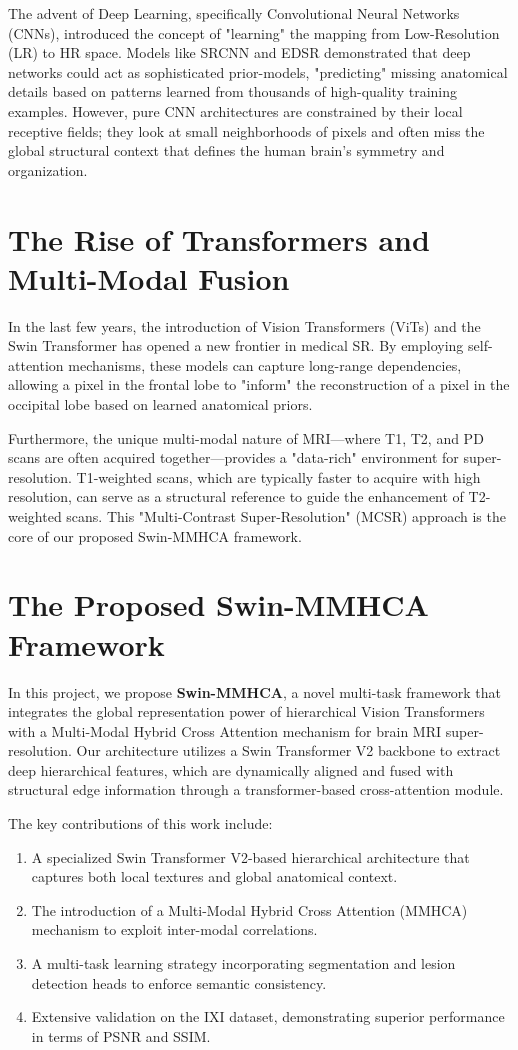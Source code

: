 The advent of Deep Learning, specifically Convolutional Neural Networks (CNNs), introduced the concept of "learning" the mapping from Low-Resolution (LR) to HR space. Models like SRCNN and EDSR demonstrated that deep networks could act as sophisticated prior-models, "predicting" missing anatomical details based on patterns learned from thousands of high-quality training examples. However, pure CNN architectures are constrained by their local receptive fields; they look at small neighborhoods of pixels and often miss the global structural context that defines the human brain's symmetry and organization.

\section{The Rise of Transformers and Multi-Modal Fusion}
In the last few years, the introduction of Vision Transformers (ViTs) and the Swin Transformer has opened a new frontier in medical SR. By employing self-attention mechanisms, these models can capture long-range dependencies, allowing a pixel in the frontal lobe to "inform" the reconstruction of a pixel in the occipital lobe based on learned anatomical priors. 

Furthermore, the unique multi-modal nature of MRI—where T1, T2, and PD scans are often acquired together—provides a "data-rich" environment for super-resolution. T1-weighted scans, which are typically faster to acquire with high resolution, can serve as a structural reference to guide the enhancement of T2-weighted scans. This "Multi-Contrast Super-Resolution" (MCSR) approach is the core of our proposed Swin-MMHCA framework.

\section{The Proposed Swin-MMHCA Framework}
In this project, we propose \textbf{Swin-MMHCA}, a novel multi-task framework that integrates the global representation power of hierarchical Vision Transformers with a Multi-Modal Hybrid Cross Attention mechanism for brain MRI super-resolution. Our architecture utilizes a Swin Transformer V2 backbone to extract deep hierarchical features, which are dynamically aligned and fused with structural edge information through a transformer-based cross-attention module.

The key contributions of this work include:
\begin{enumerate}
    \item A specialized Swin Transformer V2-based hierarchical architecture that captures both local textures and global anatomical context.
    \item The introduction of a Multi-Modal Hybrid Cross Attention (MMHCA) mechanism to exploit inter-modal correlations.
    \item A multi-task learning strategy incorporating segmentation and lesion detection heads to enforce semantic consistency.
    \item Extensive validation on the IXI dataset, demonstrating superior performance in terms of PSNR and SSIM.
\end{enumerate}

